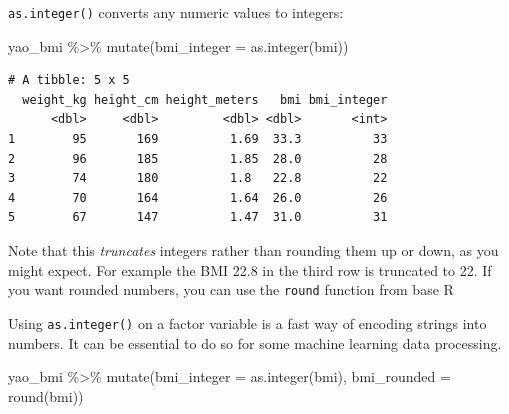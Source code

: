 \documentclass[
  letterpaper,
  DIV=11,
  numbers=noendperiod]{scrreprt}
\newenvironment{Shaded}{\begin{snugshade}}{\end{snugshade}}
\newcommand{\AttributeTok}[1]{\textcolor[rgb]{0.40,0.45,0.13}{#1}}
\newcommand{\FunctionTok}[1]{\textcolor[rgb]{0.28,0.35,0.67}{#1}}
\newcommand{\NormalTok}[1]{\textcolor[rgb]{0.00,0.23,0.31}{#1}}
\newcommand{\SpecialCharTok}[1]{\textcolor[rgb]{0.37,0.37,0.37}{#1}}
\begin{document}
\texttt{as.integer()} converts any numeric values to integers:

\begin{Shaded}
\begin{Highlighting}[]
\NormalTok{yao\_bmi }\SpecialCharTok{\%\textgreater{}\%} 
  \FunctionTok{mutate}\NormalTok{(}\AttributeTok{bmi\_integer =} \FunctionTok{as.integer}\NormalTok{(bmi))}
\end{Highlighting}
\end{Shaded}

\begin{verbatim}
# A tibble: 5 x 5
  weight_kg height_cm height_meters   bmi bmi_integer
      <dbl>     <dbl>         <dbl> <dbl>       <int>
1        95       169          1.69  33.3          33
2        96       185          1.85  28.0          28
3        74       180          1.8   22.8          22
4        70       164          1.64  26.0          26
5        67       147          1.47  31.0          31
\end{verbatim}

Note that this \emph{truncates} integers rather than rounding them up or
down, as you might expect. For example the BMI 22.8 in the third row is
truncated to 22. If you want rounded numbers, you can use the
\texttt{round} function from base R

\begin{tcolorbox}[enhanced jigsaw, colframe=quarto-callout-note-color-frame, rightrule=.15mm, opacityback=0, breakable, coltitle=black, colbacktitle=quarto-callout-note-color!10!white, bottomrule=.15mm, leftrule=.75mm, toprule=.15mm, arc=.35mm, bottomtitle=1mm, colback=white, left=2mm, opacitybacktitle=0.6, titlerule=0mm, title=\textcolor{quarto-callout-note-color}{\faInfo}\hspace{0.5em}{Pro Tip}, toptitle=1mm]

Using \texttt{as.integer()} on a factor variable is a fast way of
encoding strings into numbers. It can be essential to do so for some
machine learning data processing.

\end{tcolorbox}

\begin{Shaded}
\begin{Highlighting}[]
\NormalTok{yao\_bmi }\SpecialCharTok{\%\textgreater{}\%} 
  \FunctionTok{mutate}\NormalTok{(}\AttributeTok{bmi\_integer =} \FunctionTok{as.integer}\NormalTok{(bmi), }
         \AttributeTok{bmi\_rounded =} \FunctionTok{round}\NormalTok{(bmi)) }
\end{Highlighting}
\end{Shaded}
\end{document}
